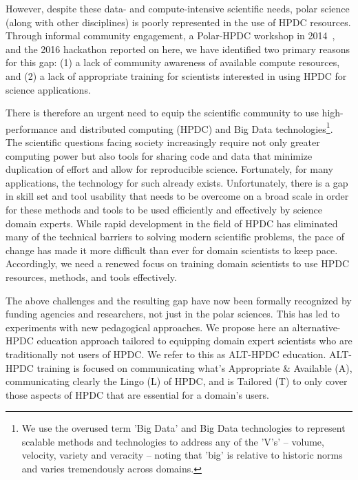\documentclass[conference]{IEEEtran}
\begin{document}
However, despite these data- and compute-intensive scientific needs, polar science (along with other disciplines) is poorly represented in the use of HPDC resources. Through informal community engagement, a Polar-HPDC workshop in 2014~\cite{Workshop2014}, and the 2016 hackathon reported on here, we have identified two primary reasons for this gap: (1) a lack of community awareness of available compute resources, and (2) a lack of appropriate training for scientists interested in using HPDC for science applications. 

There is therefore an urgent need to equip the scientific community to use high-performance and distributed computing (HPDC) and Big Data technologies\footnote{ We use the overused term 'Big Data' and Big Data technologies to represent scalable methods and technologies to address any of the 'V's'  -- volume, velocity, variety and veracity -- noting that 'big' is relative to historic norms and varies tremendously across domains.}. The scientific questions facing society increasingly require not only greater computing power but also tools for sharing code and data that minimize duplication of effort and allow for reproducible science. Fortunately, for many applications, the technology for such already exists. Unfortunately, there is a gap in skill set and tool usability that needs to be overcome on a broad scale in order for these methods and tools to be used efficiently and effectively by science domain experts. While rapid development in the field of HPDC has eliminated many of the technical barriers to solving modern scientific problems, the pace of change has made it more difficult than ever for domain scientists to keep pace. Accordingly, we need a renewed focus on training domain scientists to use HPDC resources, methods, and tools effectively. 

The above challenges and the resulting gap have now been formally recognized by funding agencies and researchers, not just in the polar sciences. This has led to experiments with new pedagogical approaches. We propose here an alternative-HPDC education approach tailored to equipping domain expert scientists who are traditionally not users of HPDC.  We refer to this as ALT-HPDC education. ALT-HPDC training is focused on communicating what's Appropriate \& Available (A), communicating clearly the Lingo (L) of HPDC, and is Tailored (T) to only cover those aspects of HPDC that are essential for a domain's users. 
\end{document}

